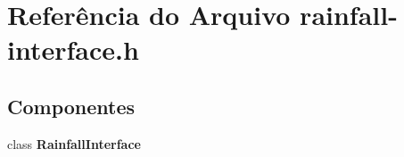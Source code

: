 \section{Referência do Arquivo rainfall-\/interface.h}
\label{rainfall-interface_8h}
\subsection*{Componentes}
\begin{DoxyCompactItemize}
\item 
class {\bf Rainfall\+Interface}
\end{DoxyCompactItemize}
